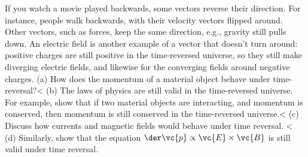         If you watch a movie played backwards, some vectors reverse their direction.
        For instance, people walk backwards, with their velocity vectors flipped around.
        Other vectors, such as forces, keep the same direction, e.g., gravity
        still pulls down. An electric field is another example of a vector that doesn't
        turn around: positive charges are still positive in the time-reversed
        universe, so they still make diverging electric fields, and likewise for
        the converging fields around negative charges. \hwendpart
        (a) How does the momentum of a material object behave under 
                time-reversal?<%
        (b) The laws of physics are still valid in the time-reversed universe.
                For example, show that if two material objects are interacting, and
                momentum is conserved, then momentum is still conserved
                in the time-reversed universe.<%
        (c) Discuss how currents and magnetic fields would behave under time reversal.
                <%
        (d) Similarly, show that the equation $\der\vc{p}\propto\vc{E}\times\vc{B}$ is still
                valid under time reversal.
